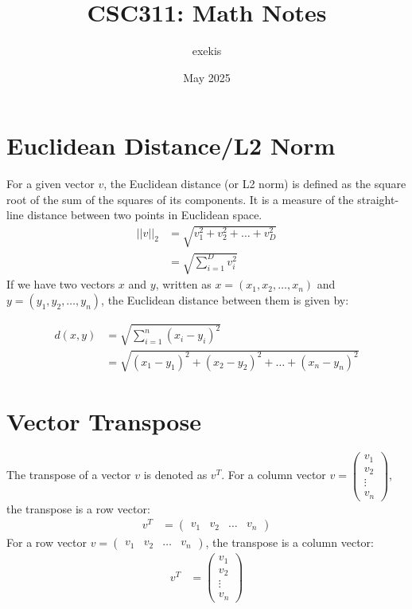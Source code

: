 \documentclass{article}
\title{CSC311: Math Notes}
\author{exekis}
\date{May 2025}
\begin{document}
\maketitle

\section*{Euclidean Distance/L2 Norm}
For a given vector $v$, the Euclidean distance (or L2 norm) is defined as the square root of the sum of the squares of its components. It is a measure of the straight-line distance between two points in Euclidean space.
\begin{align*}
|| v ||_2 &= \sqrt{v_1^2 + v_2^2 + \ldots + v_D^2} \\
&= \sqrt{\sum_{i=1}^{D} v_i^2}
\end{align*}
If we have two vectors $x$ and $y$, written as $x = (x_1, x_2, \ldots, x_n)$ and $y = (y_1, y_2, \ldots, y_n)$, the Euclidean distance between them is given by:
\begin{tcolorbox}[colback=white!10!white, colframe=navyblue!75!black, title=Euclidean Distance]
\begin{align*}
d(x, y) &= \sqrt{\sum_{i=1}^{n} (x_i - y_i)^2} \\
&= \sqrt{(x_1 - y_1)^2 + (x_2 - y_2)^2 + \ldots + (x_n - y_n)^2}
\end{align*}
\end{tcolorbox}

\section*{Vector Transpose}
The transpose of a vector $v$ is denoted as $v^T$. For a column vector $v = \begin{pmatrix} v_1 \\ v_2 \\ \vdots \\ v_n \end{pmatrix}$, the transpose is a row vector:
\begin{align*}
v^T &= \begin{pmatrix} v_1 & v_2 & \ldots & v_n \end{pmatrix}
\end{align*}
For a row vector $v = \begin{pmatrix} v_1 & v_2 & \ldots & v_n \end{pmatrix}$, the transpose is a column vector:
\begin{align*}
v^T &= \begin{pmatrix} v_1 \\ v_2 \\ \vdots \\ v_n \end{pmatrix}
\end{align*}
\end{document}
